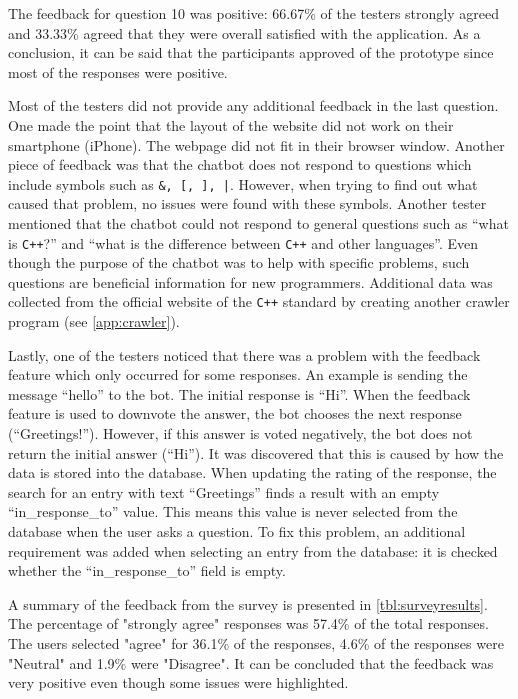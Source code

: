 \documentclass[12pt,a4paper]{article}
\begin{document}
The feedback for question 10 was positive: 66.67\% of the testers strongly agreed and 33.33\% agreed that they were overall satisfied with the application. As a conclusion, it can be said that the participants approved of the prototype since most of the responses were positive.

Most of the testers did not provide any additional feedback in the last question. One made the point that the layout of the website did not work on their smartphone (iPhone). The webpage did not fit in their browser window. Another piece of feedback was that the chatbot does not respond to questions which include symbols such as \texttt{\&, [, ], |}. However, when trying to find out what caused that problem, no issues were found with these symbols. Another tester mentioned that the chatbot could not respond to general questions such as “what is \texttt{C++}?” and “what is the difference between \texttt{C++} and other languages”. Even though the purpose of the chatbot was to help with specific problems, such questions are beneficial information for new programmers. Additional data was collected from the official website of the \texttt{C++} standard \citep{cppfaq:online} by creating another crawler program (see \cref{app:crawler}).

Lastly, one of the testers noticed that there was a problem with the feedback feature which only occurred for some responses. An example is sending the message “hello” to the bot. The initial response is “Hi”. When the feedback feature is used to downvote the answer, the bot chooses the next response (“Greetings!”). However, if this answer is voted negatively, the bot does not return the initial answer (“Hi”). It was discovered that this is caused by how the data is stored into the database. When updating the rating of the response, the search for an entry with text “Greetings” finds a result with an empty “in\_response\_to” value. This means this value is never selected from the database when the user asks a question. To fix this problem, an additional requirement was added when selecting an entry from the database: it is checked whether the “in\_response\_to” field is empty.

A summary of the feedback from the survey is presented in \cref{tbl:surveyresults}. The percentage of "strongly agree" responses was 57.4\% of the total responses. The users selected "agree" for 36.1\% of the responses, 4.6\% of the responses were "Neutral" and 1.9\% were "Disagree". It can be concluded that the feedback was very positive even though some issues were highlighted.
\end{document}

